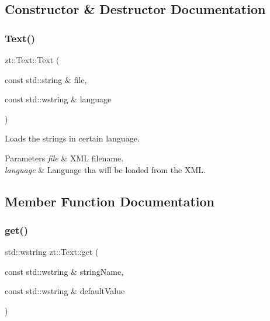 \subsection{Constructor \& Destructor Documentation}
\mbox{\label{classzt_1_1_text_a7c2c09cf73f21a53547f761643544610}} 
\subsubsection{\texorpdfstring{Text()}{Text()}}
{\footnotesize\ttfamily zt\+::\+Text\+::\+Text (\begin{DoxyParamCaption}\item[{const std\+::string \&}]{file,  }\item[{const std\+::wstring \&}]{language }\end{DoxyParamCaption})}



Loads the strings in certain language. 


\begin{DoxyParams}{Parameters}
{\em file} & X\+ML filename. \\
\hline
{\em language} & Language tha will be loaded from the X\+ML. \\
\hline
\end{DoxyParams}


\subsection{Member Function Documentation}
\mbox{\label{classzt_1_1_text_a1bdb417d6193ab286e65cbcff36ec84f}} 
\subsubsection{\texorpdfstring{get()}{get()}\hspace{0.1cm}{\footnotesize\ttfamily [1/2]}}
{\footnotesize\ttfamily std\+::wstring zt\+::\+Text\+::get (\begin{DoxyParamCaption}\item[{const std\+::wstring \&}]{string\+Name,  }\item[{const std\+::wstring \&}]{default\+Value }\end{DoxyParamCaption})}



